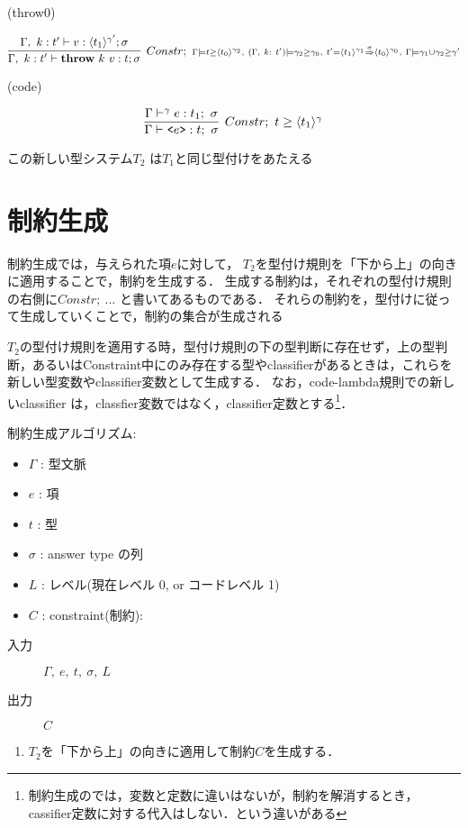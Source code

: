 (throw0)

\[
  \infer[Constr;~ {\scriptstyle \Gamma \models \longer{t}{\codeT{t_0}{\gamma_2}},~ (\Gamma,~ k:~t') \models \gamma_2 \ord \gamma_0,~  t' = \contT{\codeT{t_1}{\gamma_1}}{\codeT{t_0}{\gamma_0}}{\sigma},~ \Gamma \models \gamma_1 \uni \gamma_2 \ord \gamma'}]
  {\Gamma,~ k:t'
    \vdash \throw{k}{v} : t ; \sigma}
  {\Gamma,~ k:t'
    \vdash v : \codeT{t_1}{\gamma'} ; \sigma
  }
\]

(code)

\[
  \infer[Constr;~\longer{t}{\codeT{t_1}{\gamma}}]
  {\Gamma \vdash \code{e} : t;~\sigma}
  {\Gamma \vdash^\gamma e : t_1;~\sigma}
\]


この新しい型システム$T_2$ は$T_1$と同じ型付けをあたえる

\section{制約生成}

制約生成では，与えられた項$e$に対して，
$T_2$を型付け規則を「下から上」の向きに適用することで，制約を生成する．
生成する制約は，それぞれの型付け規則の右側に$Constr;~ ...$ と書いてあるものである．
それらの制約を，型付けに従って生成していくことで，制約の集合が生成される

$T_2$の型付け規則を適用する時，型付け規則の下の型判断に存在せず，上の型判断，あるいはConstraint中にのみ存在する型やclassifierがあるときは，これらを新しい型変数やclassifier変数として生成する．
なお，code-lambda規則での新しいclassifier は，classfier変数ではなく，classifier定数とする\footnote{制約生成のでは，変数と定数に違いはないが，制約を解消するとき，cassifier定数に対する代入はしない．という違いがある}．

\begin{framed}
  制約生成アルゴリズム:
  \begin{itemize}
    \setlength{\itemsep}{-5pt}
  \item $\Gamma$ : 型文脈
  \item $e$ : 項
  \item $t$ : 型
  \item $\sigma$ : answer type の列
  \item $L$ : レベル(現在レベル 0, or コードレベル 1)
  \item $C$ : constraint(制約):
  \end{itemize}

  \begin{description}
  \item[入力] $\Gamma,~ e,~ t,~ \sigma,~ L$
  \item[出力] $C$
  \end{description}

  \begin{enumerate}
  \item $T_2$を「下から上」の向きに適用して制約$C$を生成する．
  \end{enumerate}
\end{framed}

